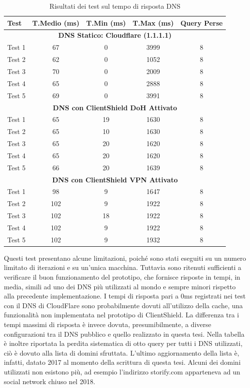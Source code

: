 \documentclass[12pt,a4paper,openright,twoside]{book}
\begin{document}
\begin{table}[h]
	\centering
	\renewcommand{\arraystretch}{1.3} %
	\setlength{\tabcolsep}{10pt} %
	\begin{tabular}{lcccc}
		\toprule
		\textbf{Test} & \textbf{T.Medio (ms)} & \textbf{T.Min (ms)} & \textbf{T.Max (ms)} & \textbf{Query Perse} \\
		\midrule
		\multicolumn{5}{c}{\textbf{DNS Statico: Cloudflare (1.1.1.1)}} \\
		\midrule
		Test 1 & 67 & 0 & 3999 & 8 \\
		Test 2 & 62 & 0 & 1052 & 8 \\
		Test 3 & 70 & 0 & 2009 & 8 \\
		Test 4 & 65 & 0 & 2888 & 8 \\
		Test 5 & 69 & 0 & 3991 & 8 \\
		\midrule
		\multicolumn{5}{c}{\textbf{DNS con ClientShield DoH Attivato}} \\
		\midrule
		Test 1 & 65 & 19 & 1630 & 8 \\
		Test 2 & 65 & 10 & 1630 & 8 \\
		Test 3 & 65 & 20 & 1620 & 8 \\
		Test 4 & 65 & 20 & 1620 & 8 \\
		Test 5 & 66 & 20 & 1639 & 8 \\
		\midrule
		\multicolumn{5}{c}{\textbf{DNS con ClientShield VPN Attivato}} \\
		\midrule
		Test 1 & 98 & 9 & 1647 & 8 \\
		Test 2 & 102 & 9 & 1922 & 8 \\
		Test 3 & 102 & 18 & 1922 & 8 \\
		Test 4 & 102 & 9 & 1922 & 8 \\
		Test 5 & 102 & 9 & 1932 & 8 \\
		\bottomrule
	\end{tabular}
	\caption{Risultati dei test sul tempo di risposta DNS}
	\label{tab:dns-tests}
\end{table}
Questi test presentano alcune limitazioni, poiché sono stati eseguiti su un numero limitato di iterazioni e su un'unica macchina.
Tuttavia sono ritenuti sufficienti a verificare il buon funzionamento del prototipo, che fornisce risposte in tempi, in media, simili ad uno dei \gls{DNS} più utilizzati al mondo e sempre minori rispetto alla precedente implementazione.
I tempi di risposta pari a 0ms registrati nei test con il \gls{DNS} di CloudFlare sono probabilmente dovuti all'utilizzo della cache, una funzionalità non implementata nel prototipo di ClientShield.
La differenza tra i tempi massimi di risposta è invece dovuta, presumibilmente, a diverse configurazioni tra il \gls{DNS} pubblico e quello realizzato in questa tesi.
Nella tabella è inoltre riportata la perdita sistematica di otto query per tutti i \gls{DNS} utilizzati, ciò è dovuto alla lista di domini sfruttata.
L'ultimo aggiornamento della lista è, infatti, datato 2017 al momento della scrittura di questa tesi.
Alcuni dei domini utilizzati non esistono più, ad esempio l'indirizzo storify.com apparteneva ad un social network chiuso nel 2018.
\end{document}
